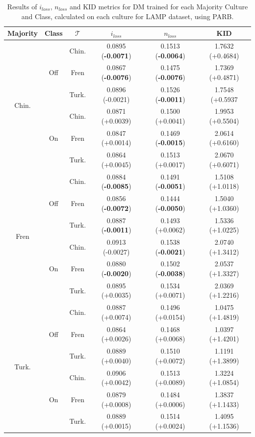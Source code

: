 %
\begin{table}[]
\centering
\begin{tabular}{c|c|c|c|c|c}
    \textbf{Majority} & \textbf{Class} & \textbf{$\mathcal{T}$} & \textbf{$i_{loss}$} & \textbf{$n_{loss}$} & \textbf{KID} \\
    \toprule
\multirow{6}{*}{Chin.} & \multirow{3}{*}{Off}  & Chin. & 0.0895 (\textbf{-0.0071})       & 0.1513 (\textbf{-0.0064})       & 1.7632 (+0.4684)  \\
 &  & Fren & 0.0867 (\textbf{-0.0076})       & 0.1475 (\textbf{-0.0076})       & 1.7369 (+0.4871) \\
 &  & Turk. & 0.0896 (-0.0021)       & 0.1526 (\textbf{-0.0011})       & 1.7548 (+0.5937 \\
\hhline{~-----}
 & \multirow{3}{*}{On} & Chin. & 0.0871 (+0.0039)       & 0.1500 (+0.0041)       & 1.9953 (+0.5504) \\
 &  & Fren & 0.0847 (+0.0014)       & 0.1469 (\textbf{-0.0015})       & 2.0614 (+0.6160) \\
 &  & Turk. & 0.0864 (+0.0045)       & 0.1513 (+0.0017)       & 2.0670 (+0.6071) \\
\midrule
\multirow{6}{*}{Fren} & \multirow{3}{*}{Off} & Chin. &  0.0884 (\textbf{-0.0085})       & 0.1491 (\textbf{-0.0051})       & 1.5108 (+1.0118)  \\
 &  & Fren & 0.0856 (\textbf{-0.0072})       & 0.1444 (\textbf{-0.0050})       & 1.5040 (+1.0360) \\
 &  & Turk. &0.0887 (\textbf{-0.0011})       & 0.1493 (+0.0062)       & 1.5336 (+1.0225)  \\
\hhline{~-----}
 & \multirow{3}{*}{On} & Chin. &0.0913 (-0.0027)       & 0.1538 (\textbf{-0.0021})       & 2.0740 (+1.3412) \\
 &  & Fren & 0.0880 (\textbf{-0.0020})       & 0.1502 (\textbf{-0.0038})       & 2.0537 (+1.3327) \\
 &  & Turk. & 0.0895 (+0.0035)       & 0.1534 (+0.0071)       & 2.0369 (+1.2216)  \\
\midrule
\multirow{6}{*}{Turk.} & \multirow{3}{*}{Off}& Chin. & 0.0887 (+0.0074)       & 0.1496 (+0.0154)       & 1.0475 (+1.4819)  \\
 &  & Fren & 0.0864 (+0.0026)       & 0.1468 (+0.0068)       & 1.0397 (+1.4201) \\
 &  & Turk. & 0.0889 (+0.0040)       & 0.1510 (+0.0072)       & 1.1191 (+1.3899) \\
\hhline{~-----}
 & \multirow{3}{*}{On} & Chin. &0.0906 (+0.0042)       & 0.1513 (+0.0089)       & 1.3224 (+1.0854) \\
 &  & Fren &  0.0879 (+0.0008)       & 0.1484 (+0.0006)       & 1.3837 (+1.1433) \\
 &  & Turk. & 0.0889 (+0.0015)       & 0.1514 (+0.0024)       & 1.4095 (+1.1536) \\
\bottomrule
    \end{tabular}
    \caption{Results of $i_{loss}$, $n_{loss}$ and KID metrics for DM trained for each Majority Culture and Class, calculated on each culture for LAMP dataset, using PARB.}
    \label{ch3:tab:genDMPARB}
\end{table}
